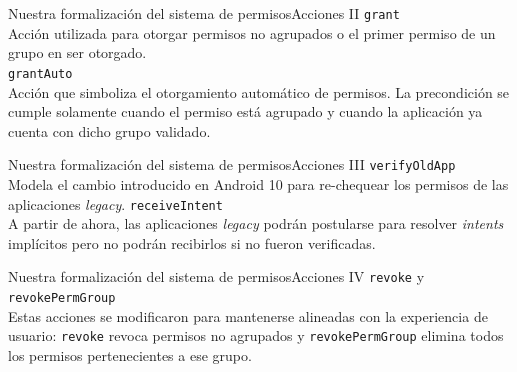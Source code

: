 \documentclass[pdf, handout]{beamer} %
\begin{document}
\begin{frame}{Nuestra formalización del sistema de permisos}{Acciones II}
    \texttt{grant}\\
    \vspace{5px}
    Acción utilizada para otorgar permisos no agrupados o el primer permiso de un grupo en ser
    otorgado.\\
    \pause
    \vspace{10px}
    \texttt{grantAuto}\\
    \vspace{5px}
    Acción que simboliza el otorgamiento automático de permisos. La precondición se cumple solamente
    cuando el permiso está agrupado y cuando la aplicación ya cuenta con dicho grupo validado.
\end{frame}

\begin{frame}{Nuestra formalización del sistema de permisos}{Acciones III}
    \texttt{verifyOldApp}\\
    \vspace{5px}
    Modela el cambio introducido en Android 10 para re-chequear los permisos de las aplicaciones
    \textit{legacy}.
    \pause
    \vspace{10px}
    \texttt{receiveIntent}\\
    \vspace{5px}
    A partir de ahora, las aplicaciones \textit{legacy} podrán postularse para resolver
    \textit{intents} implícitos pero no podrán recibirlos si no fueron verificadas.
\end{frame}

\begin{frame}{Nuestra formalización del sistema de permisos}{Acciones IV}
    \texttt{revoke} y \texttt{revokePermGroup}\\
    \vspace{5px}
    Estas acciones se modificaron para mantenerse alineadas con la experiencia de usuario:
    \texttt{revoke} revoca permisos no agrupados y \texttt{revokePermGroup} elimina todos los
    permisos pertenecientes a ese grupo.\\
\end{frame}
\end{document}
